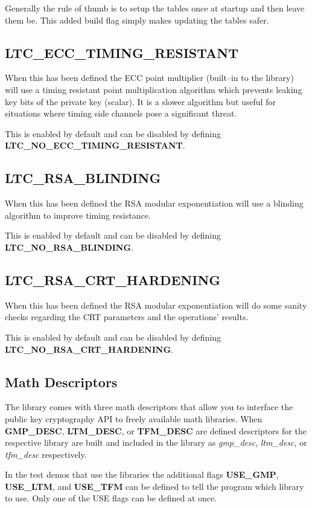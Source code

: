 \documentclass[synpaper]{book}
\begin{document}
Generally the rule of thumb is to setup the tables once at startup and then leave them be.  This added build flag simply makes updating
the tables safer.

\subsection{LTC\_ECC\_TIMING\_RESISTANT}
When this has been defined the ECC point multiplier (built--in to the library) will use a timing resistant point multiplication
algorithm which prevents leaking key bits of the private key (scalar).  It is a slower algorithm but useful for situations
where timing side channels pose a significant threat.

This is enabled by default and can be disabled by defining \textbf{LTC\_NO\_ECC\_TIMING\_RESISTANT}.

\subsection{LTC\_RSA\_BLINDING}
When this has been defined the RSA modular exponentiation will use a blinding algorithm to improve timing resistance.

This is enabled by default and can be disabled by defining \textbf{LTC\_NO\_RSA\_BLINDING}.

\subsection{LTC\_RSA\_CRT\_HARDENING}
When this has been defined the RSA modular exponentiation will do some sanity checks regarding the CRT parameters and the operations' results.

This is enabled by default and can be disabled by defining \textbf{LTC\_NO\_RSA\_CRT\_HARDENING}.

\subsection{Math Descriptors}
 
\label{mp-init}
The library comes with three math descriptors that allow you to interface the public key cryptography API to freely available math
libraries.  When \textbf{GMP\_DESC}, \textbf{LTM\_DESC}, or \textbf{TFM\_DESC} are defined
descriptors for the respective library are built and included in the library as \textit{gmp\_desc}, \textit{ltm\_desc}, or \textit{tfm\_desc} respectively.

In the test demos that use the libraries the additional flags \textbf{USE\_GMP}, \textbf{USE\_LTM}, and \textbf{USE\_TFM} can be defined
to tell the program which library to use.  Only one of the USE flags can be defined at once.
\end{document}
